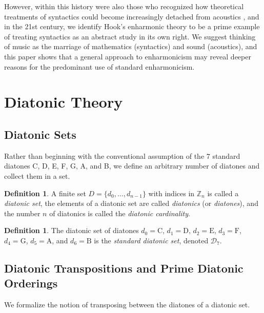 \documentclass{article}
\theoremstyle{plain}
\theoremstyle{definition}
\newtheorem{definition}[theorem]{Definition}
\theoremstyle{remark}
\begin{document}
However, within this history were also those who recognized how theoretical treatments of syntactics could become increasingly detached from acoustics \cite{Fetis}, and in the 21st century, we identify Hook's enharmonic theory to be a prime example of treating syntactics as an abstract study in its own right. We suggest thinking of music as the marriage of mathematics (syntactics) and sound (acoustics), and this paper shows that a general approach to enharmonicism may reveal deeper reasons for the predominant use of standard enharmonicism.

\section{Diatonic Theory}
\label{SEC.Diatonic Theory}

\subsection{Diatonic Sets}
\label{SSEC.Diatonic Sets}

Rather than beginning with the conventional assumption of the $7$ standard diatones C, D, E, F, G, A, and B, we define an arbitrary number of diatones and collect them in a set.

\begin{definition}
\label{DEF.Diatonic Set}
	A finite set $D=\{d_0,\dots,d_{n-1}\}$ with indices in $\mathbb{Z}_n$ is called a \textit{diatonic set}, the elements of a diatonic set are called \textit{diatonics} (or \textit{diatones}), and the number $n$ of diatonics is called the \textit{diatonic cardinality}.
\end{definition}

\begin{definition}
	The diatonic set of diatones $d_0=\textrm{C}$, $d_1=\textrm{D}$, $d_2=\textrm{E}$, $d_3=\textrm{F}$, $d_4=\textrm{G}$, $d_5=\textrm{A}$, and $d_6=\textrm{B}$ is the \textit{standard diatonic set}, denoted $\mathcal{D}_7$.
\end{definition}

\subsection{Diatonic Transpositions and Prime Diatonic Orderings}
\label{SSEC.Diatonic Transpositions and Prime Diatonic Orderings}

We formalize the notion of transposing between the diatones of a diatonic set.
\end{document}
